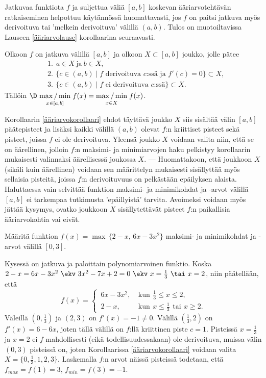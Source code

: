 Jatkuvaa funktiota $f$ ja suljettua väliä $[a,b]$ koskevan ääriarvotehtävän ratkaiseminen
helpottuu käytännössä huomattavasti, jos $f$ on paitsi jatkuva myös derivoituva tai
'melkein derivoituva' välillä $(a,b)$. Tulos on muotoiltavissa Lauseen \ref{ääriarvolause}
korollaarina seuraavasti.
\begin{Kor} \label{ääriarvokorollaari} Olkoon $f$ on jatkuva välillä $[a,b]$ ja olkoon
$X\subset[a,b]$ joukko, jolle pätee
\begin{align*}
&\text{1.} \ \ a \in X\ \text{ja}\ b \in X, \\
&\text{2.} \,\ \{c\in(a,b) \mid \text{$f$ derivoituva $c$:ssä ja $f'(c)=0$}\} \subset X, \\
&\text{3.} \,\ \{c \in (a,b) \mid \text{$f$ ei derivoituva $c$:ssä}\} \subset X.
\end{align*}
Tällöin $\D\ \underset{x\in [a,b]}{\max/\min} \; f(x)=\underset{x\in X}{\max/\min} \; f(x)$.
\end{Kor}
Korollaarin \ref{ääriarvokorollaari} ehdot täyttävä joukko $X$ siis sisältää välin $[a,b]$
päätepisteet ja lisäksi kaikki välillä $(a,b)$ olevat $f$:n kriittiset pisteet sekä pisteet,
joissa $f$ ei ole derivoituva. Yleensä joukko $X$ voidaan valita niin, että se on äärellinen,
jolloin $f$:n maksimi- ja minimiarvojen haku pelkistyy korollaarin mukaisesti valinnaksi
äärellisessä joukossa $X$. --- Huomattakoon, että joukkoon $X$ (sikäli kuin äärellinen) voidaan
sen määrittelyn mukaisesti sisällyttää myös sellaisia pisteitä, joissa $f$:n derivoituvuus
on pelkästään epäilyksen alaista. Haluttaessa vain selvittää funktion maksimi- ja minimikohdat
ja -arvot välillä $[a,b]$ ei tarkempaa tutkimusta 'epäillyistä' tarvita. Avoimeksi voidaan myös
jättää kysymys, ovatko joukkoon $X$ sisällytettävät pisteet $f$:n paikallisia ääriarvokohtia
vai eivät.
\begin{Exa} \label{ääriarvoesimerkki} Määritä funktion $f(x) = \max\,\{2-x,\,6x-3x^2\}$ 
maksimi- ja minimikohdat ja -arvot välillä $[0,3]$. 
\end{Exa}
\ratk Kysessä on jatkuva ja paloittain polynomiarvoinen funktio. Koska \newline
$2-x = 6x-3x^2\ \ekv\ 3x^2-7x+2=0\ \ekv\ x=\tfrac{1}{3}\ \tai\ x=2$, niin päätellään, että
\[
f(x) = \begin{cases} 
       \,6x-3x^2,\ &\text{kun}\,\ \tfrac{1}{3} \le x \le 2, \\ 
       \,2-x,\     &\text{kun}\,\ x \le \tfrac{1}{3}\,\ \text{tai}\,\ x \ge 2. 
       \end{cases}
\]
Väleillä $(0,\tfrac{1}{3})$ ja $(2,3)$ on $f'(x)=-1 \neq 0$. Välillä $(\tfrac{1}{3},2)$ on
$f'(x)=6-6x$, joten tällä välillä on $f$:llä kriittinen piste $c=1$. Pisteissä
$x=\tfrac{1}{3}$ ja $x=2$ ei $f$ mahdollisesti (eikä todellisuudessakaan) ole derivoituva,
muissa välin $(0,3)$ pisteissä on, joten Korollaarissa \ref{ääriarvokorollaari} voidaan valita
$X=\{0,\tfrac{1}{3},1,2,3\}$. Laskemalla $f$:n arvot näissä pisteissä todetaan, että
$f_{max}=f(1)=3$, $f_{min}=f(3)=-1$. \loppu

